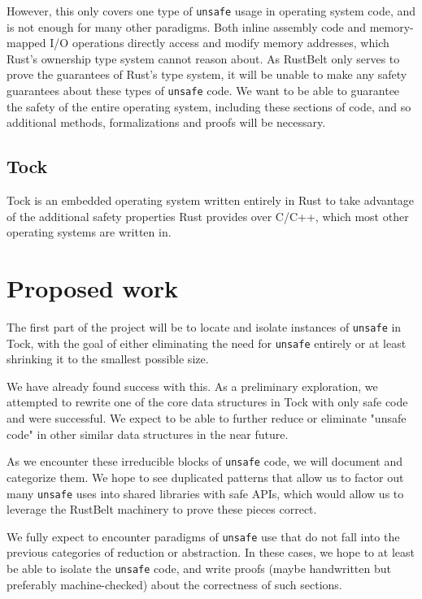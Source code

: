 \documentclass[12pt]{article}
\begin{document}
However, this only covers one type of \texttt{unsafe} usage in operating system code, and is not enough for many other paradigms. Both inline assembly code and memory-mapped I/O operations directly access and modify memory addresses, which Rust's ownership type system cannot reason about. As RustBelt only serves to prove the guarantees of Rust's type system, it will be unable to make any safety guarantees about these types of \texttt{unsafe} code. We want to be able to guarantee the safety of the entire operating system, including these sections of code, and so additional methods, formalizations and proofs will be necessary.

\subsection{Tock}
Tock is an embedded operating system written entirely in Rust to take advantage of the additional safety properties Rust provides over C/C++, which most other operating systems are written in.

\section{Proposed work}
The first part of the project will be to locate and isolate instances of \texttt{unsafe} in Tock, with the goal of either eliminating the need for \texttt{unsafe} entirely or at least shrinking it to the smallest possible size. 

We have already found success with this. As a preliminary exploration, we attempted to rewrite one of the core data structures in Tock with only safe code and were successful. We expect to be able to further reduce or eliminate "unsafe code" in other similar data structures in the near future.

As we encounter these irreducible blocks of \texttt{unsafe} code, we will document and categorize them. We hope to see duplicated patterns that allow us to factor out many \texttt{unsafe} uses into shared libraries with safe APIs, which would allow us to leverage the RustBelt machinery to prove these pieces correct.

We fully expect to encounter paradigms of \texttt{unsafe} use that do not fall into the previous categories of reduction or abstraction. In these cases, we hope to at least be able to isolate the \texttt{unsafe} code, and write proofs (maybe handwritten but preferably machine-checked) about the correctness of such sections.
\end{document}
